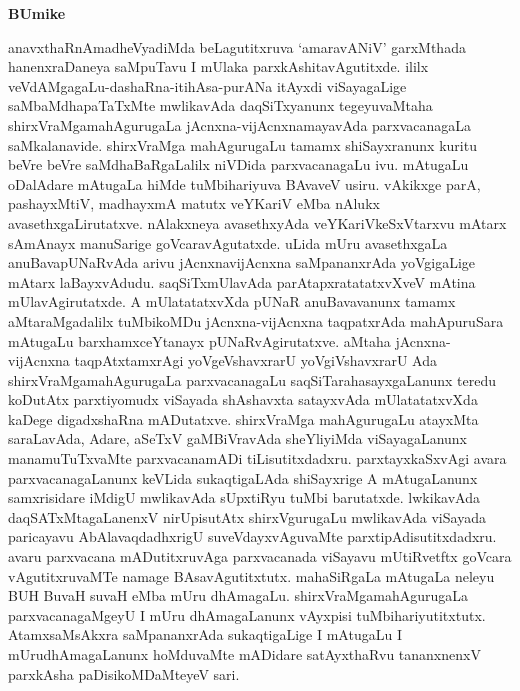 \newpage
\thispagestyle{empty}
\begin{center}
{\Large\bf BUmike}
\end{center}
 
 anavxthaRnAmadheVyadiMda beLagutitxruva `amaravANiV' garxMthada hanenxraDaneya saMpuTavu I mUlaka parxkAshitavAgutitxde. ililx veVdAMgagaLu-dashaRna-itihAsa-purANa itAyxdi viSayagaLige saMbaMdhapaTaTxMte mwlikavAda daqSiTxyanunx tegeyuvaMtaha shirxVraMgamahAgurugaLa jAcnxna-vijAcnxnamayavAda parxvacanagaLa saMkalanavide. shirxVraMga mahAgurugaLu tamamx shiSayxranunx kuritu beVre beVre saMdhaBaRgaLalilx niVDida parxvacanagaLu ivu. mAtugaLu oDalAdare mAtugaLa hiMde tuMbihariyuva BAvaveV usiru. vAkikxge parA, pashayxMtiV, madhayxmA matutx veYKariV eMba nAlukx avasethxgaLirutatxve. nAlakxneya avasethxyAda veYKariVkeSxVtarxvu mAtarx sAmAnayx manuSarige goVcaravAgutatxde. uLida mUru avasethxgaLa anuBavapUNaRvAda arivu jAcnxnavijAcnxna saMpananxrAda yoVgigaLige mAtarx laBayxvAdudu. saqSiTxmUlavAda parAtapxratatatxvXveV mAtina mUlavAgirutatxde. A mUlatatatxvXda pUNaR anuBavavanunx tamamx aMtaraMgadalilx tuMbikoMDu jAcnxna-vijAcnxna taqpatxrAda mahApuruSara mAtugaLu barxhamxceYtanayx pUNaRvAgirutatxve. aMtaha jAcnxna-vijAcnxna taqpAtxtamxrAgi yoVgeVshavxrarU yoVgiVshavxrarU Ada shirxVraMgamahAgurugaLa parxvacanagaLu saqSiTarahasayxgaLanunx teredu koDutAtx parxtiyomudx viSayada shAshavxta satayxvAda mUlatatatxvXda kaDege digadxshaRna mADutatxve. shirxVraMga mahAgurugaLu atayxMta saraLavAda, Adare, aSeTxV gaMBiVravAda sheYliyiMda viSayagaLanunx manamuTuTxvaMte parxvacanamADi tiLisutitxdadxru. parxtayxkaSxvAgi avara parxvacanagaLanunx keVLida sukaqtigaLAda shiSayxrige A mAtugaLanunx samxrisidare iMdigU mwlikavAda sUpxtiRyu tuMbi barutatxde. lwkikavAda daqSATxMtagaLanenxV nirUpisutAtx shirxVgurugaLu mwlikavAda viSayada paricayavu AbAlavaqdadhxrigU suveVdayxvAguvaMte parxtipAdisutitxdadxru. avaru parxvacana mADutitxruvAga parxvacanada viSayavu mUtiRvetftx goVcara vAgutitxruvaMTe namage BAsavAgutitxtutx. mahaSiRgaLa mAtugaLa neleyu BUH  BuvaH suvaH eMba mUru dhAmagaLu. shirxVraMgamahAgurugaLa parxvacanagaMgeyU I mUru dhAmagaLanunx vAyxpisi tuMbihariyutitxtutx. AtamxsaMsAkxra saMpananxrAda sukaqtigaLige I mAtugaLu I mUrudhAmagaLanunx hoMduvaMte mADidare satAyxthaRvu tananxnenxV parxkAsha paDisikoMDaMteyeV sari.

